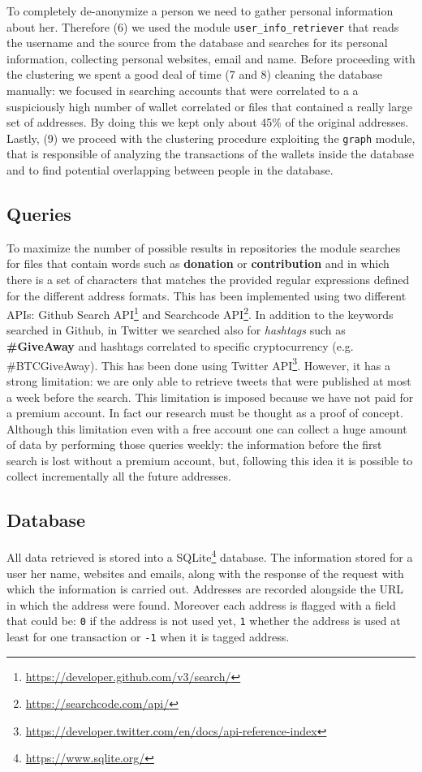To completely de-anonymize a person we need to gather personal information
about her. Therefore (6) we used the module \verb|user_info_retriever| that
reads the username and the source from the database and searches for its
personal information, collecting personal websites, email and name.
Before proceeding with the clustering we spent a good deal of time (7 and 8)
cleaning the database manually: we focused in searching accounts that were
correlated to a a suspiciously high number of wallet correlated or files that
contained a really large set of addresses. By doing this we kept only about 45\%
of the original addresses.
Lastly, (9) we proceed with the clustering procedure exploiting the \verb|graph|
module, that is responsible of analyzing the transactions of the wallets 
inside the database and to find potential overlapping between people in the
database.

\subsection{Queries}
\label{sec:queries}
To maximize the number of possible results in repositories the module
\walletcollector{} searches for files that contain words such as
\textbf{donation} or \textbf{contribution} and in which there is a set of
characters that matches the provided regular expressions defined for the
different address formats. This has been implemented using two different APIs:
Github Search API\footnote{\url{https://developer.github.com/v3/search/}} and
Searchcode API\footnote{\url{https://searchcode.com/api/}}.
In addition to the keywords searched in Github, in Twitter we searched also for
\textit{hashtags} such as \textbf{\#GiveAway} and
hashtags correlated to specific cryptocurrency (e.g. \#BTCGiveAway). This has
been done using Twitter
API\footnote{\url{https://developer.twitter.com/en/docs/api-reference-index}}.
However, it has a strong limitation: we are only able to retrieve tweets that
were published at most a week before the search. This limitation is imposed
because we have not paid for a premium account. In fact our research must be
thought as a proof of concept.
Although this limitation even with a free account one can collect a huge amount
of data by performing those queries weekly:
the information before the first search is lost without a premium account, but,
following this idea it is possible to collect incrementally all the future
addresses.

\subsection{Database}
All data retrieved is stored into a
SQLite\footnote{\url{https://www.sqlite.org/}} database. The information stored
for a user her name, websites and emails, along with the response of the request
with which the information is carried out. Addresses are recorded alongside the
URL in which the address were found. Moreover each address is flagged with a
field that could be: \texttt{0} if the address is not used yet, \texttt{1}
whether the address is used at least for one transaction or \texttt{-1} when it
is tagged address.